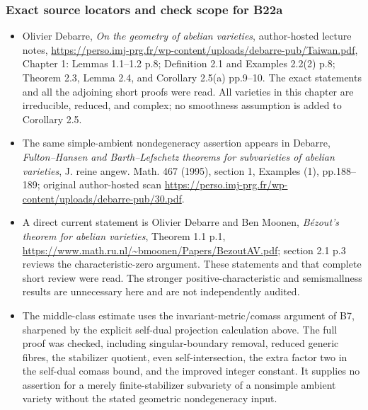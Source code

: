 \subsubsection{Exact source locators and check scope for B22a}\label{exact-source-locators-and-check-scope-for-b22a}

\begin{itemize}
\tightlist
\item
  Olivier Debarre, \emph{On the geometry of abelian varieties}, author-hosted lecture notes, \url{https://perso.imj-prg.fr/wp-content/uploads/debarre-pub/Taiwan.pdf}, Chapter 1: Lemmas 1.1--1.2 p.8; Definition 2.1 and Examples 2.2(2) p.8; Theorem 2.3, Lemma 2.4, and Corollary 2.5(a) pp.9--10. The exact statements and all the adjoining short proofs were read. All varieties in this chapter are irreducible, reduced, and complex; no smoothness assumption is added to Corollary 2.5.
\item
  The same simple-ambient nondegeneracy assertion appears in Debarre, \emph{Fulton--Hansen and Barth--Lefschetz theorems for subvarieties of abelian varieties}, J. reine angew. Math. 467 (1995), section 1, Examples (1), pp.188--189; original author-hosted scan \url{https://perso.imj-prg.fr/wp-content/uploads/debarre-pub/30.pdf}.
\item
  A direct current statement is Olivier Debarre and Ben Moonen, \emph{Bézout's theorem for abelian varieties}, Theorem 1.1 p.1, \url{https://www.math.ru.nl/~bmoonen/Papers/BezoutAV.pdf}; section 2.1 p.3 reviews the characteristic-zero argument. These statements and that complete short review were read. The stronger positive-characteristic and semismallness results are unnecessary here and are not independently audited.
\item
  The middle-class estimate uses the invariant-metric/comass argument of B7, sharpened by the explicit self-dual projection calculation above. The full proof was checked, including singular-boundary removal, reduced generic fibres, the stabilizer quotient, even self-intersection, the extra factor two in the self-dual comass bound, and the improved integer constant. It supplies no assertion for a merely finite-stabilizer subvariety of a nonsimple ambient variety without the stated geometric nondegeneracy input.
\end{itemize}
